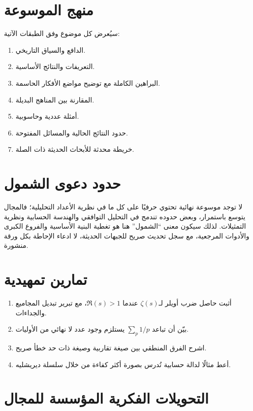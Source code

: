 \section{منهج الموسوعة}

سيُعرض كل موضوع وفق الطبقات الآتية:

\begin{enumerate}
  \item الدافع والسياق التاريخي.
  \item التعريفات والنتائج الأساسية.
  \item البراهين الكاملة مع توضيح مواضع الأفكار الحاسمة.
  \item المقارنة بين المناهج البديلة.
  \item أمثلة عددية وحاسوبية.
  \item حدود النتائج الحالية والمسائل المفتوحة.
  \item خريطة محدثة للأبحاث الحديثة ذات الصلة.
\end{enumerate}

\section{حدود دعوى الشمول}

لا توجد موسوعة نهائية تحتوي حرفيًا على كل ما في نظرية الأعداد التحليلية؛ فالمجال يتوسع باستمرار، وبعض حدوده تندمج في التحليل التوافقي والهندسة الحسابية ونظرية التمثيلات. لذلك سيكون معنى ``الشمول'' هنا هو تغطية البنية الأساسية والفروع الكبرى والأدوات المرجعية، مع سجل تحديث صريح للجبهات الحديثة، لا ادعاء الإحاطة بكل ورقة منشورة.

\section{تمارين تمهيدية}

\begin{enumerate}
  \item أثبت حاصل ضرب أويلر لـ\(\zeta(s)\) عندما \(\Re(s)>1\)، مع تبرير تبديل المجاميع والجداءات.
  \item بيّن أن تباعد \(\sum_p 1/p\) يستلزم وجود عدد لا نهائي من الأوليات.
  \item اشرح الفرق المنطقي بين صيغة تقاربية وصيغة ذات حد خطأ صريح.
  \item أعط مثالًا لدالة حسابية تُدرس بصورة أكثر كفاءة من خلال سلسلة ديريشليه.
\end{enumerate}


\section{التحويلات الفكرية المؤسسة للمجال}

